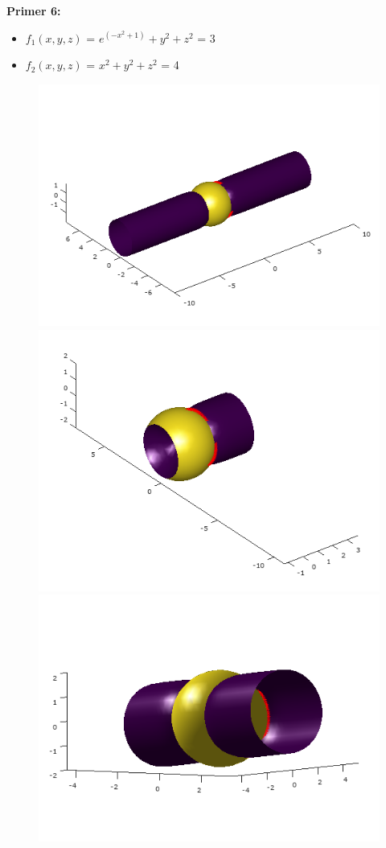 \documentclass[12pt]{article}
\begin{document}
	\begin{minipage}{\textwidth}
		\textbf{\large{Primer 6:}}
		\begin{itemize}  
			\item $f_{1}(x,y,z)$ = $e^{(-x^{2}+1)}+y^{2}+z^{2}$ = 3
			\item $f_{2}(x,y,z)$ = $x^2 + y^2 + z^2$ = 4
		\end{itemize}
		\begin{figure}[H]
			\centering
			\includegraphics[scale=0.5]{primer6_1}
			\includegraphics[scale=0.5]{primer6_2}
			\includegraphics[scale=0.5]{primer6_3}

\end{figure}
\end{minipage}
\end{document}
